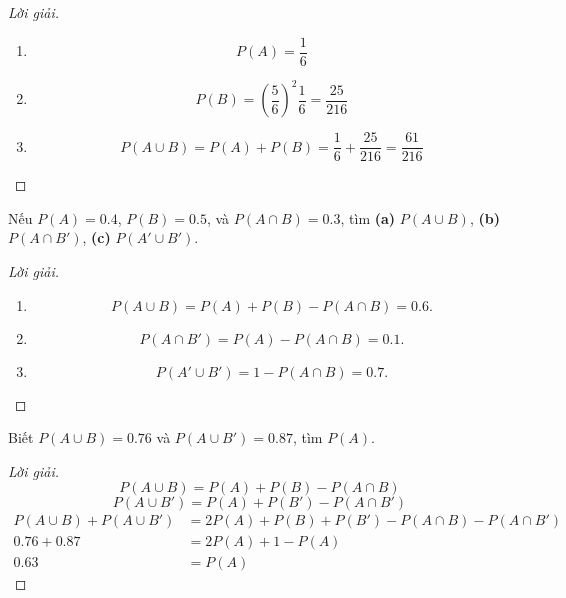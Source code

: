 \documentclass[class=probandstats,crop=false]{standalone}
\begin{document}
\begin{proof}[Lời giải]
    \begin{enumerate}[label = \textbf{(\alph*)}]
        \item
              \[ P(A) = \dfrac{1}{6} \]
        \item
              \[
                  P(B) = \left(\dfrac{5}{6}\right)^{2}\dfrac{1}{6} = \dfrac{25}{216}
              \]
        \item
              \[
                  P(A\cup B) = P(A) + P(B) = \dfrac{1}{6} + \dfrac{25}{216} = \dfrac{61}{216}
              \]
    \end{enumerate}
\end{proof}

\begin{exercise}
    \par Nếu $P(A) = 0.4$, $P(B) = 0.5$, và $P(A\cap B) = 0.3$, tìm \textbf{(a)} $P(A\cup B)$, \textbf{(b)} $P(A\cap B')$, \textbf{(c)} $P(A'\cup B')$.
\end{exercise}

\begin{proof}[Lời giải]
    \begin{enumerate}[label = \textbf{(\alph*)}]
        \item
              \[ P(A\cup B) = P(A) + P(B) - P(A\cap B) = 0.6. \]
        \item
              \[ P(A\cap B') = P(A) - P(A\cap B) = 0.1. \]
        \item
              \[ P(A'\cup B') = 1 - P(A\cap B) = 0.7. \]
    \end{enumerate}
\end{proof}

\begin{exercise}
    \par Biết $P(A\cup B) = 0.76$ và $P(A\cup B') = 0.87$, tìm $P(A)$.
\end{exercise}

\begin{proof}[Lời giải]
    \[ P(A\cup B) = P(A) + P(B) - P(A\cap B) \]
    \[ P(A\cup B') = P(A) + P(B') - P(A\cap B') \]
    \begin{align*}
        P(A\cup B) + P(A\cup B') & = 2P(A) + P(B) + P(B') - P(A\cap B) - P(A\cap B') \\
        0.76 + 0.87              & = 2P(A) + 1 - P(A)                                \\
        0.63                     & = P(A)
    \end{align*}
\end{proof}
\end{document}
